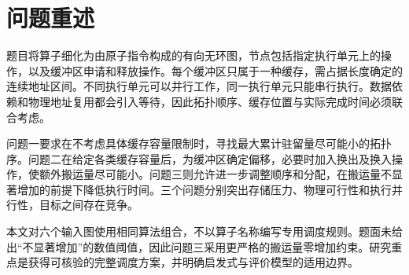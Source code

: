 \section{问题重述}
题目将算子细化为由原子指令构成的有向无环图，节点包括指定执行单元上的操作，以及缓冲区申请和释放操作\cite{statement}。每个缓冲区只属于一种缓存，需占据长度确定的连续地址区间。不同执行单元可以并行工作，同一执行单元只能串行执行。数据依赖和物理地址复用都会引入等待，因此拓扑顺序、缓存位置与实际完成时间必须联合考虑。

问题一要求在不考虑具体缓存容量限制时，寻找最大累计驻留量尽可能小的拓扑序。问题二在给定各类缓存容量后，为缓冲区确定偏移，必要时加入换出及换入操作，使额外搬运量尽可能小。问题三则允许进一步调整顺序和分配，在搬运量不显著增加的前提下降低执行时间。三个问题分别突出存储压力、物理可行性和执行并行性，目标之间存在竞争。

本文对六个输入图使用相同算法组合，不以算子名称编写专用调度规则。题面未给出“不显著增加”的数值阈值，因此问题三采用更严格的搬运量零增加约束。研究重点是获得可核验的完整调度方案，并明确启发式与评价模型的适用边界。
